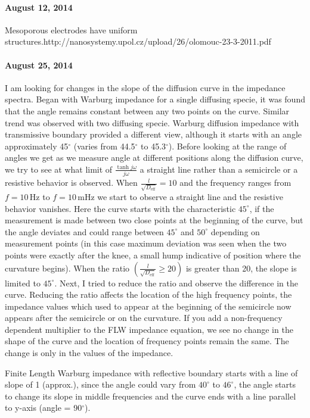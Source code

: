 \documentclass[12pt]{book}
\begin{document}
\paragraph{August 12, 2014}
Mesoporous electrodes have uniform structures.http://nanosystemy.upol.cz/upload/26/olomouc-23-3-2011.pdf
\paragraph{August 25, 2014}
I am looking for changes in the slope of the diffusion curve in the impedance spectra. Began with Warburg impedance for a single diffusing specie, it was found that the angle remains constant between any two points on the curve. Similar trend was observed with two diffusing specie. Warburg diffusion impedance with transmissive boundary provided a different view, although it starts with an angle approximately 45$^\circ$ (varies from 44.5$^\circ$ to 45.3$^\circ$). Before looking at the range of angles we get as we measure angle at different positions along the diffusion curve, we try to see at what limit of $\frac{\tanh{j\omega}}{j\omega}$ a straight line rather than a semicircle or a resistive behavior is observed. When  $\frac{l}{\sqrt{D_{\textrm{eff}}}}=10$ and the frequency ranges from $f=10\,\textrm{Hz}$ to $f=10\,\textrm{mHz}$ we start to observe a straight line and the resistive behavior vanishes. Here the curve starts with the characteristic $45^\circ$, if the measurement is made between two close points at the beginning of the curve, but the angle deviates and could range between $45^\circ$ and $50^\circ$ depending on measurement points (in this case maximum deviation was seen when the two points were exactly after the knee, a small hump indicative of position where the curvature begins). When the ratio $\left(\frac{l}{\sqrt{D_{\textrm{eff}}}}\geq20\right)$ is greater than 20, the slope is limited to $45^\circ$. Next, I tried to reduce the ratio and observe the difference in the curve. Reducing the ratio affects the location of the high frequency points, the impedance values which used to appear at the beginning of the semicircle now appears after the semicircle or on the curvature. If you add a non-frequency dependent multiplier to the FLW impedance equation, we see no change in the shape of the curve and the location of frequency points remain the same. The change is only in the values of the impedance.

Finite Length Warburg impedance with reflective boundary starts with a line of slope of 1 (approx.), since the angle could vary from $40^\circ$ to $46^\circ$, the angle starts to change its slope in middle frequencies and the curve ends with a line parallel to y-axis (angle = 90$^\circ$). 
\end{document}
